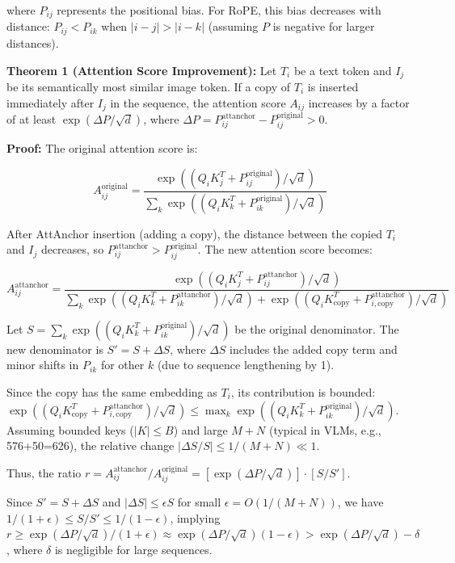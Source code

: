 \documentclass[11pt]{article}
\begin{document}
where $P_{ij}$ represents the positional bias. For RoPE, this bias decreases with distance: $P_{ij} < P_{ik}$ when $|i - j| > |i - k|$ (assuming $P$ is negative for larger distances).

\textbf{Theorem 1 (Attention Score Improvement):} Let $T_i$ be a text token and $I_j$ be its semantically most similar image token. If a copy of $T_i$ is inserted immediately after $I_j$ in the sequence, the attention score $A_{ij}$ increases by a factor of at least $\exp(\Delta P / \sqrt{d})$, where $\Delta P = P^{\text{attanchor}}_{ij} - P^{\text{original}}_{ij} > 0$.

\textbf{Proof:} The original attention score is:

$$A^{\text{original}}_{ij} = \frac{\exp((Q_i K_j^T + P^{\text{original}}_{ij}) / \sqrt{d})}{\sum_k \exp((Q_i K_k^T + P^{\text{original}}_{ik}) / \sqrt{d})}$$

After AttAnchor insertion (adding a copy), the distance between the copied $T_i$ and $I_j$ decreases, so $P^{\text{attanchor}}_{ij} > P^{\text{original}}_{ij}$. The new attention score becomes:

$$A^{\text{attanchor}}_{ij} = \frac{\exp((Q_i K_j^T + P^{\text{attanchor}}_{ij}) / \sqrt{d})}{\sum_k \exp((Q_i K_k^T + P^{\text{attanchor}}_{ik}) / \sqrt{d}) + \exp((Q_i K_{\text{copy}}^T + P^{\text{attanchor}}_{i,\text{copy}}) / \sqrt{d})}$$

Let $S = \sum_k \exp((Q_i K_k^T + P^{\text{original}}_{ik}) / \sqrt{d})$ be the original denominator. The new denominator is $S' = S + \Delta S$, where $\Delta S$ includes the added copy term and minor shifts in $P_{ik}$ for other $k$ (due to sequence lengthening by 1).

Since the copy has the same embedding as $T_i$, its contribution is bounded: $\exp((Q_i K_{\text{copy}}^T + P^{\text{attanchor}}_{i,\text{copy}}) / \sqrt{d}) \leq \max_k \exp((Q_i K_k^T + P^{\text{original}}_{ik}) / \sqrt{d})$. Assuming bounded keys ($|K| \leq B$) and large $M+N$ (typical in VLMs, e.g., 576+50=626), the relative change $|\Delta S / S| \leq 1/(M+N) \ll 1$.

Thus, the ratio $r = A^{\text{attanchor}}_{ij} / A^{\text{original}}_{ij} = [\exp(\Delta P / \sqrt{d})] \cdot [S / S']$.

Since $S' = S + \Delta S$ and $|\Delta S| \leq \epsilon S$ for small $\epsilon = O(1/(M+N))$, we have $1 / (1 + \epsilon) \leq S / S' \leq 1 / (1 - \epsilon)$, implying $r \geq \exp(\Delta P / \sqrt{d}) / (1 + \epsilon) \approx \exp(\Delta P / \sqrt{d}) (1 - \epsilon) > \exp(\Delta P / \sqrt{d}) - \delta$, where $\delta$ is negligible for large sequences.
\end{document}
